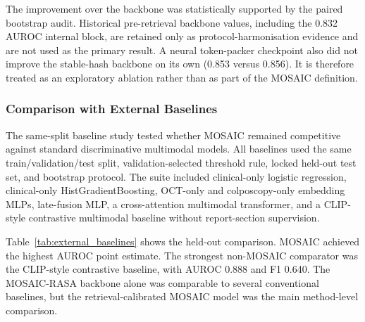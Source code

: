 \documentclass[11pt, a4paper]{article}
\theoremstyle{plain}
\theoremstyle{definition}
\begin{document}
The improvement over the backbone was statistically supported by the paired bootstrap audit. Historical pre-retrieval backbone values, including the 0.832 AUROC internal block, are retained only as protocol-harmonisation evidence and are not used as the primary result. A neural token-packer checkpoint also did not improve the stable-hash backbone on its own (0.853 versus 0.856). It is therefore treated as an exploratory ablation rather than as part of the MOSAIC definition.

\subsubsection{Comparison with External Baselines}
\label{subsec:external_baseline_results}

The same-split baseline study tested whether MOSAIC remained competitive against standard discriminative multimodal models. All baselines used the same train/validation/test split, validation-selected threshold rule, locked held-out test set, and bootstrap protocol. The suite included clinical-only logistic regression, clinical-only HistGradientBoosting, OCT-only and colposcopy-only embedding MLPs, late-fusion MLP, a cross-attention multimodal transformer, and a CLIP-style contrastive multimodal baseline without report-section supervision.

Table~\ref{tab:external_baselines} shows the held-out comparison. MOSAIC achieved the highest AUROC point estimate. The strongest non-MOSAIC comparator was the CLIP-style contrastive baseline, with AUROC 0.888 and F1 0.640. The MOSAIC-RASA backbone alone was comparable to several conventional baselines, but the retrieval-calibrated MOSAIC model was the main method-level comparison.
\end{document}
